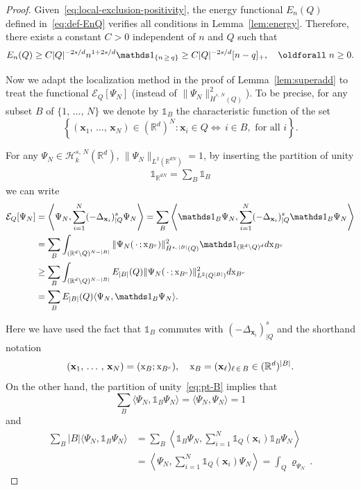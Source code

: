 \documentclass[AHL, Unicode, longabstracts, published]{cedram}
\newcommand*\R {\mathbb{R}}
\newcommand\1{{\ensuremath {\mathds 1} }}
\newcommand{\bx}{\mathbf{x}}
\newcommand{\cH}{\mathcal{H}}
\newcommand{\sx}{\textup{x}}
\newcommand{\cE}{\mathcal{E}}
\renewcommand*{\forall}{\mathrel{\oldforall}}
\begin{document}
\begin{proof}
Given~\eqref{eq:local-exclusion-positivity},
the energy functional $E_{n}(Q)$ defined in~\eqref{eq:def-EnQ} verifies all conditions in Lemma~\ref{lem:energy}. Therefore, there exists a constant $C>0$ independent of $n$ and $Q$ such that
\begin{equation}\label{eq:EnQ-lower-bound}
E_n(Q) \ge C |Q|^{-2s/d} n^{1+2s/d} \1_{\{n\,\ge\,q\}} \ge C |Q|^{-2s/d} [n-q]_+, \quad \forall n\ge 0.
\end{equation}

Now we adapt the localization method in the proof of Lemma~\ref{lem:superadd} to treat the functional $\cE_Q[\Psi_N]$ (instead of $\|\Psi_N\|_{\dot H^{s,\,N}(Q)}^2$). To be precise, for any subset $B$ of $\{1,\,\ldots,\,N\}$ we denote by $\1_B$ the characteristic function of the set
\[
\left\{ (\bx_1,\,\dots,\,\bx_N) \in (\R^d)^N : \bx_i\in Q \Leftrightarrow\, i \in B, \text{ for all } i\right\}.
\]

For any $\Psi_N\in \cH^{s,\,N}_k(\R^d)$, $\|\Psi_N\|_{L^2(\R^{dN})}=1$, by inserting the partition of unity
\begin{align}\label{eq:pt-B}
\1_{\R^{dN}} = \sum_{B} \1_B
\end{align}
we can write
\begin{equation}\label{eq:local-EQ-lowerbound}
\begin{aligned}
\cE_Q[\Psi_N] &=\left\langle \Psi_N, \sum_{i=1}^N (-\Delta_{\bx_i})^s_{|Q} \Psi_N \right\rangle =
\sum_{B} \left\langle \1_B \Psi_N, \sum_{i=1}^N (-\Delta_{\bx_i})^s_{|Q} \1_{B} \Psi_N \right\rangle\\
&=
\sum_{B} \int_{(\R^{d}\setminus Q)^{N-|B|}} \|\Psi_N(\,\cdot\,;\sx_{B^c})\|^2_{\dot H^{s,\,|B|}(Q)} \1_{(\R^d\setminus Q)^d}d \sx_{B^c}\\
&\ge
\sum_{B} \int_{(\R^{d}\setminus Q)^{N-|B|}} E_{|B|}(Q)\|\Psi_N(\,\cdot\,;\sx_{B^c})\|^2_{L^2(Q^{|B|})} d \sx_{B^c}\\
&=
\sum_{B} E_{|B|}(Q) \langle \Psi_N, \1_B \Psi_N\rangle.
\end{aligned}
\end{equation}


Here we have used the fact that $\1_B$ commutes with $(-\Delta_{\bx_i})^s_{|Q}$ and the shorthand notation
\[
(\bx_1,\,\ldots\,,\,\bx_N)=(\sx_{B};\sx_{B^c}), \quad \sx_{B}= (\bx_\ell)_{\ell\,\in\,B} \in (\R^{d})^{ |B|}.
\]
On the other hand, the partition of unity~\eqref{eq:pt-B} implies that
\[
\sum_{B} \langle \Psi_N, \1_B \Psi_N\rangle = \langle \Psi_N, \Psi_N\rangle =1
\]
and
\begin{align*}
\sum_{B} |B| \langle \Psi_N, \1_B \Psi_N\rangle
&= \sum_{B} \left \langle \1_B \Psi_N, \sum_{i=1}^N \1_Q(\bx_i) \1_B \Psi_N \right \rangle\\
&= \left \langle \Psi_N, \sum_{i=1}^N \1_Q(\bx_i) \Psi_N \right \rangle= \int_Q \varrho_{\Psi_N}\,.
\end{align*}



\end{proof}
\end{document}
